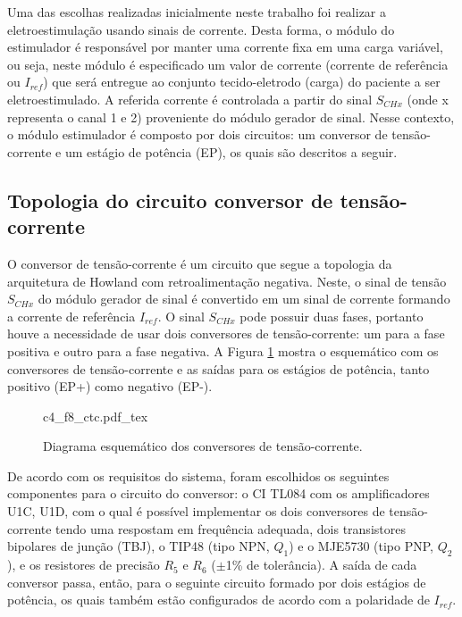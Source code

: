 Uma das escolhas realizadas inicialmente neste trabalho foi realizar a eletroestimulação usando sinais de corrente. Desta forma, o módulo do estimulador é responsável por manter uma corrente fixa em uma carga variável, ou seja, neste módulo é especificado um valor de corrente (corrente de referência ou $I_{ref}$) que será entregue ao conjunto tecido-eletrodo (carga) do paciente a ser eletroestimulado. A referida corrente é controlada a partir do sinal $S_{CHx}$ (onde x representa o canal 1 e 2) proveniente do módulo gerador de sinal. Nesse contexto, o módulo estimulador é composto por dois circuitos: um conversor de tensão-corrente e um estágio de potência (\acrshort{EP}), os quais são descritos a seguir.


\subsection*{Topologia do circuito conversor de tensão-corrente}
O conversor de tensão-corrente é um circuito que segue a topologia da arquitetura de Howland com retroalimentação negativa. Neste, o sinal de tensão $S_{CHx}$ do módulo gerador de sinal é convertido em um sinal de corrente formando a corrente de referência $I_{ref}$. O sinal $S_{CHx}$ pode possuir duas fases, portanto houve a necessidade de usar dois conversores de tensão-corrente: um para a fase positiva e outro para a fase negativa. A Figura \ref{fig:c4_f8_ctc} mostra o esquemático com os conversores de tensão-corrente e as saídas para os estágios de potência, tanto positivo (\acrshort{EP}+) como negativo (\acrshort{EP}-). 

 
\begin{figure}[h]
    \centering %
    \small %
    \def\svgwidth{0.8\columnwidth}%
    {c4_f8_ctc.pdf_tex}
    \caption{Diagrama esquemático dos conversores de tensão-corrente.}
    \label{fig:c4_f8_ctc}
\end{figure}


De acordo com os requisitos do sistema, foram escolhidos os seguintes componentes para o circuito do conversor: o \acrshort{CI} TL084 com os amplificadores U1C, U1D, com o qual é possível implementar os dois conversores de tensão-corrente tendo uma respostam em frequência adequada, dois transistores bipolares de junção (\acrshort{TBJ}), o TIP48 (tipo NPN, $Q_1$) e o MJE5730 (tipo PNP, $Q_2$), e os resistores de precisão $R_5$ e $R_6$ ($\mathrm{\pm}$1\% de tolerância). A saída de cada conversor passa, então, para o seguinte circuito formado por dois estágios de potência, os quais também estão configurados de acordo com a polaridade de $I_{ref}$.

